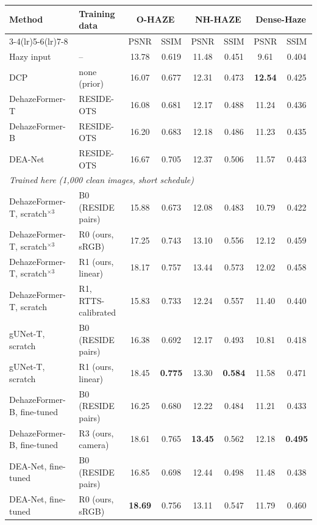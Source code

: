 \begin{tabular}{llcccccc}
\toprule
Method & Training data & \multicolumn{2}{c}{O-HAZE} & \multicolumn{2}{c}{NH-HAZE} & \multicolumn{2}{c}{Dense-Haze} \\
\cmidrule(lr){3-4}\cmidrule(lr){5-6}\cmidrule(lr){7-8}
 & & PSNR & SSIM & PSNR & SSIM & PSNR & SSIM \\
\midrule
Hazy input & -- & 13.78 & 0.619 & 11.48 & 0.451 & 9.61 & 0.404 \\
DCP~\cite{he2011dcp} & none (prior) & 16.07 & 0.677 & 12.31 & 0.473 & \textbf{12.54} & 0.425 \\
DehazeFormer-T~\cite{song2023dehazeformer} & RESIDE-OTS & 16.08 & 0.681 & 12.17 & 0.488 & 11.24 & 0.436 \\
DehazeFormer-B~\cite{song2023dehazeformer} & RESIDE-OTS & 16.20 & 0.683 & 12.18 & 0.486 & 11.23 & 0.435 \\
DEA-Net~\cite{chen2024deanet} & RESIDE-OTS & 16.67 & 0.705 & 12.37 & 0.506 & 11.57 & 0.443 \\
\midrule \multicolumn{8}{l}{\emph{Trained here (1{,}000 clean images, short schedule)}} \\
DehazeFormer-T, scratch$^{\times3}$ & B0 (RESIDE pairs) & 15.88 & 0.673 & 12.08 & 0.483 & 10.79 & 0.422 \\
DehazeFormer-T, scratch$^{\times3}$ & R0 (ours, sRGB) & 17.25 & 0.743 & 13.10 & 0.556 & 12.12 & 0.459 \\
DehazeFormer-T, scratch$^{\times3}$ & R1 (ours, linear) & 18.17 & 0.757 & 13.44 & 0.573 & 12.02 & 0.458 \\
DehazeFormer-T, scratch & R1, RTTS-calibrated & 15.83 & 0.733 & 12.24 & 0.557 & 11.40 & 0.440 \\
gUNet-T, scratch & B0 (RESIDE pairs) & 16.38 & 0.692 & 12.17 & 0.493 & 10.81 & 0.418 \\
gUNet-T, scratch & R1 (ours, linear) & 18.45 & \textbf{0.775} & 13.30 & \textbf{0.584} & 11.58 & 0.471 \\
DehazeFormer-B, fine-tuned & B0 (RESIDE pairs) & 16.25 & 0.680 & 12.22 & 0.484 & 11.21 & 0.433 \\
DehazeFormer-B, fine-tuned & R3 (ours, camera) & 18.61 & 0.765 & \textbf{13.45} & 0.562 & 12.18 & \textbf{0.495} \\
DEA-Net, fine-tuned & B0 (RESIDE pairs) & 16.85 & 0.698 & 12.44 & 0.498 & 11.48 & 0.438 \\
DEA-Net, fine-tuned & R0 (ours, sRGB) & \textbf{18.69} & 0.756 & 13.11 & 0.547 & 11.79 & 0.460 \\
\bottomrule
\end{tabular}